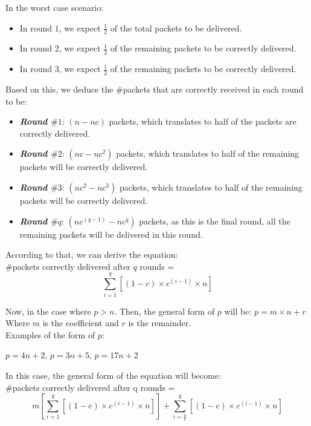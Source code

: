 \documentclass[main.tex]{subfiles}
\begin{document}
In the worst case scenario:
\begin{itemize}
\item In round $1$, we expect $\frac{1}{2}$ of the total packets to be delivered.
\item In round $2$, we expect $\frac{1}{2}$ of the remaining packets to be correctly delivered.
\item In round $3$, we expect $\frac{1}{2}$ of the remaining packets to be correctly delivered.
\end{itemize}
Based on this, we deduce the \#packets that are correctly received in each round to be:
\begin{itemize}
\item \textbf{\textit{Round $\#1$}}: \( \displaystyle (n - nc)\) packets, which translates to half of the packets are correctly delivered.
\item \textbf{\textit{Round $\#2$}}: \( \displaystyle (nc - nc^2)\) packets, which translates to half of the remaining packets will be correctly delivered.
\item \textbf{\textit{Round $\#3$}}: \( \displaystyle (nc^2  - nc^3)\) packets, which translates to half of the remaining packets will be correctly delivered.
\item \textbf{\textit{Round $\#q$}}: \( \displaystyle (nc^{(q-1)} - nc^q)\) packets, as this is the final round, all the remaining packets will be delivered in this round.
\end{itemize}
According to that, we can derive the equation:\\
\#packets correctly delivered after $q$ rounds =\begin{equation}  \sum_{i=1}^{q} [(1-c) \times c^{(i-1)} \times n]\end{equation}

Now, in the case where $p > n$. Then, the general form of $p$ will be: $p = m \times n + r$\\
Where $m$ is the coefficient and $r$ is the remainder.\\
Examples of the form of $p$:
\begin{center}$p = \displaystyle 4n + 2$, \tab$p = \displaystyle 3n + 5$, \tab$p = \displaystyle 17n + 2$\end{center}
In this case, the general form of the equation will become:\\
 \#packets correctly delivered after q rounds =\begin{equation} m[ \sum_{i=1}^{q} [(1-c) \times c^{(i-1)} \times n]] + \sum_{i=\frac{n}{r}}^{q} [(1-c) \times c^{(i-1)} \times n]\end{equation}
\end{document}
